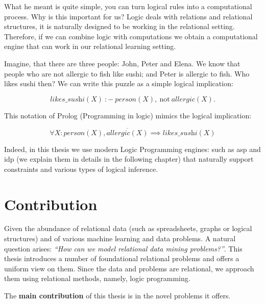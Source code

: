 What he meant is quite simple, you can turn logical rules into a
computational process. Why is this important for us? Logic deals with
relations and relational structures, it is naturally designed to be
working in the relational setting. Therefore, if we can combine logic
with computations we obtain a computational engine that can work in
our relational learning setting.


Imagine, that there are three people: John, Peter and Elena. We know
that people who are not allergic to fish like sushi; and Peter is
allergic to fish. Who likes sushi then? We can write this puzzle as a
simple logical implication:

\begin{equation*}
  \textit{likes\_sushi}(X)~{:}{-}~\textit{person}(X),~\text{not}~
  \textit{allergic}(X). 
\end{equation*}

This notation of Prolog (Programming in logic) mimics the logical implication:

\begin{equation*}
  \forall X: \textit{person}(X), \overline{\textit{allergic}(X)}
  \implies \textit{likes\_sushi}(X)
\end{equation*}

Indeed, in this thesis we use modern Logic Programming engines: such
as \acrlong{asp} \cite{ASPbook,whatisasp} and \acrlong{idp}
\parencite{idp} (we explain them in details in the following chapter)
that naturally support constraints and various types of logical
inference.


\section{Contribution}
Given the abundance of relational data (such as spreadsheets, graphs
or logical structures) and of various machine learning and data
problems. A natural question arises: \textit{``How can we model
relational data mining problems?''}. This thesis introduces a number
of foundational relational problems and offers a uniform view on them.
Since the data and problems are relational, we approach them using
relational methods, namely, logic programming.

The \textbf{main contribution} of this thesis is in the novel problems
it offers.

